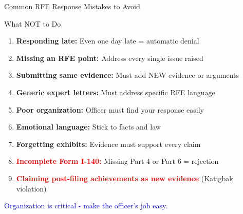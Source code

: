 \documentclass[11pt]{beamer}
\begin{document}
	\begin{frame}{Common RFE Response Mistakes to Avoid}
		\scriptsize
		\begin{block}{What NOT to Do}
			\begin{enumerate}
				\item \textbf{Responding late:} Even one day late = automatic denial
				\item \textbf{Missing an RFE point:} Address every single issue raised
				\item \textbf{Submitting same evidence:} Must add NEW evidence or arguments
				\item \textbf{Generic expert letters:} Must address specific RFE language
				\item \textbf{Poor organization:} Officer must find your response easily
				\item \textbf{Emotional language:} Stick to facts and law
				\item \textbf{Forgetting exhibits:} Evidence must support every claim
				\item \textbf{\textcolor{red}{Incomplete Form I-140:}} Missing Part 4 or Part 6 = rejection
				\item \textbf{\textcolor{red}{Claiming post-filing achievements as new evidence}} (Katigbak violation)
			\end{enumerate}
			\textcolor{blue}{Organization is critical - make the officer's job easy.}
		\end{block}
	\end{frame}
	
	
\end{document}
